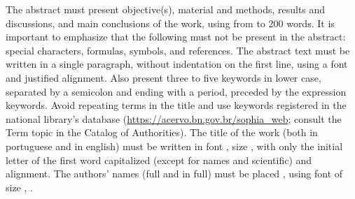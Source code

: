\documentclass{article}
\begin{document}
\begin{Abstract}[english]%
The abstract must present objective{(s)}, material and methods, results and discussions, and main conclusions of the work, using from  to 200 words.
It is important to emphasize that the following must not be present in the abstract: special characters, formulas, symbols, and references.
The abstract text must be written in a single paragraph, without indentation on the first line, using a   font and justified alignment.
Also present three to five keywords in lower case, separated by a semicolon and ending with a period, preceded by the expression keywords.
Avoid repeating terms in the title and use keywords registered in the national library's database (\url{https://acervo.bn.gov.br/sophia_web}; consult the Term topic in the Catalog of Authorities).
The title of the work (both in portuguese and in english) must be written in font , size , with only the initial letter of the first word capitalized (except for names and scientific) and  alignment.
The authors' names (full and in full) must be placed , using font  of size , .
\end{Abstract}

\BoldCaption%

\makeindex%


\end{document}
